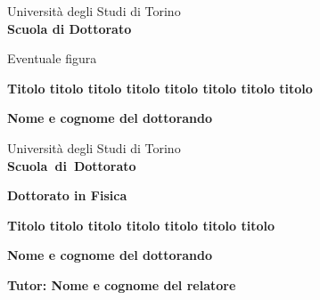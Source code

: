 \begin{titlepage}

\thispagestyle{empty}
\begin{center}
\begin{large}
Universit\`a degli Studi di Torino \\
{\bf Scuola di Dottorato} \\
\end{large}
\end{center}
\hrulefill

\vspace{2cm}
Eventuale figura

\vspace{8cm}

\large{\bf Titolo titolo titolo titolo titolo titolo titolo titolo}

\vspace{2cm}

\large{\bf Nome e cognome del dottorando}
\newpage
{}
\begin{center}
\begin{large}
Universit\`a degli Studi di Torino \\
{\bf Scuola~di~Dottorato}
\end{large}
\end{center}
\hrulefill
\begin{center}
\begin{large}
{\bf Dottorato in Fisica}
\end{large}
\end{center}

\vspace{2cm}
\Large{\bf Titolo titolo titolo titolo titolo titolo titolo}

\vspace{8cm}
\large{\bf Nome e cognome del dottorando}

\vspace{1cm}
\large{\bf Tutor: Nome e cognome del relatore}

\end{titlepage} 
